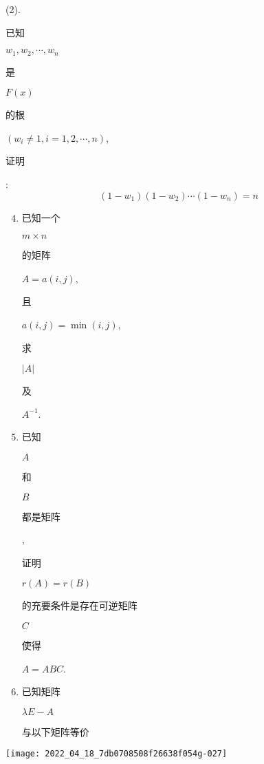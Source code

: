 \documentclass[10pt]{article}
\begin{document}
(2). \begin{CJK}{UTF8}{mj}已知\end{CJK} $w_{1}, w_{2}, \cdots, w_{n}$ \begin{CJK}{UTF8}{mj}是\end{CJK} $F(x)$ \begin{CJK}{UTF8}{mj}的根\end{CJK} $\left(w_{i} \neq 1, i=1,2, \cdots, n\right)$, \begin{CJK}{UTF8}{mj}证明\end{CJK}:
$$
\left(1-w_{1}\right)\left(1-w_{2}\right) \cdots\left(1-w_{n}\right)=n
$$

\begin{enumerate}
  \setcounter{enumi}{3}
  \item \begin{CJK}{UTF8}{mj}已知一个\end{CJK} $m \times n$ \begin{CJK}{UTF8}{mj}的矩阵\end{CJK} $A=a(i, j)$, \begin{CJK}{UTF8}{mj}且\end{CJK} $a(i, j)=\min (i, j)$, \begin{CJK}{UTF8}{mj}求\end{CJK} $|A|$ \begin{CJK}{UTF8}{mj}及\end{CJK} $A^{-1}$.

  \item \begin{CJK}{UTF8}{mj}已知\end{CJK} $A$ \begin{CJK}{UTF8}{mj}和\end{CJK} $B$ \begin{CJK}{UTF8}{mj}都是矩阵\end{CJK}, \begin{CJK}{UTF8}{mj}证明\end{CJK} $r(A)=r(B)$ \begin{CJK}{UTF8}{mj}的充要条件是存在可逆矩阵\end{CJK} $C$ \begin{CJK}{UTF8}{mj}使得\end{CJK} $A=A B C$.

  \item \begin{CJK}{UTF8}{mj}已知矩阵\end{CJK} $\lambda E-A$ \begin{CJK}{UTF8}{mj}与以下矩阵等价\end{CJK}

\end{enumerate}
\texttt{[image: 2022\_04\_18\_7db0708508f26638f054g-027]}
\end{document}
